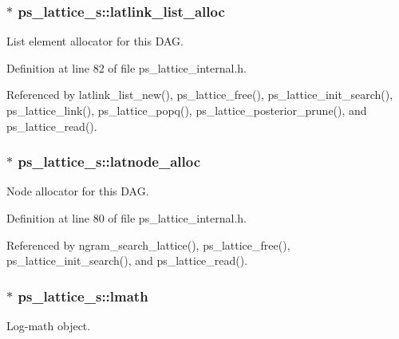\subsubsection[{latlink\-\_\-list\-\_\-alloc}]{$\ast$ ps\-\_\-lattice\-\_\-s\-::latlink\-\_\-list\-\_\-alloc}\label{structps__lattice__s_a8e9cfaf92f9a3588d018578854c61e88}


List element allocator for this D\-A\-G. 



Definition at line 82 of file ps\-\_\-lattice\-\_\-internal.\-h.



Referenced by latlink\-\_\-list\-\_\-new(), ps\-\_\-lattice\-\_\-free(), ps\-\_\-lattice\-\_\-init\-\_\-search(), ps\-\_\-lattice\-\_\-link(), ps\-\_\-lattice\-\_\-popq(), ps\-\_\-lattice\-\_\-posterior\-\_\-prune(), and ps\-\_\-lattice\-\_\-read().

\subsubsection[{latnode\-\_\-alloc}]{$\ast$ ps\-\_\-lattice\-\_\-s\-::latnode\-\_\-alloc}\label{structps__lattice__s_a14e4e87550647d5119cd1cc48ff4f3f1}


Node allocator for this D\-A\-G. 



Definition at line 80 of file ps\-\_\-lattice\-\_\-internal.\-h.



Referenced by ngram\-\_\-search\-\_\-lattice(), ps\-\_\-lattice\-\_\-free(), ps\-\_\-lattice\-\_\-init\-\_\-search(), and ps\-\_\-lattice\-\_\-read().

\subsubsection[{lmath}]{$\ast$ ps\-\_\-lattice\-\_\-s\-::lmath}\label{structps__lattice__s_a28f4ff5039e0961d57331d2605801010}


Log-\/math object. 



